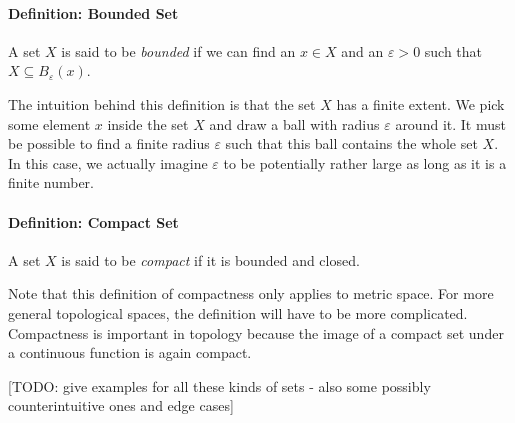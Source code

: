 
\paragraph{Definition: Bounded Set} A set $X$ is said to be \emph{bounded} if we can find an $x \in X$ and an $\varepsilon > 0$ such that $X \subseteq B_\varepsilon(x)$. 

\medskip
The intuition behind this definition is that the set $X$ has a finite extent. We pick some element $x$ inside the set $X$ and draw a ball with radius $\varepsilon$ around it. It must be possible to find a finite radius $\varepsilon$ such that this ball contains the whole set $X$. In this case, we actually imagine $\varepsilon$ to be potentially rather large as long as it is a finite number.

\paragraph{Definition: Compact Set} A set $X$ is said to be \emph{compact} if it is bounded and closed.

\medskip
Note that this definition of compactness only applies to metric space. For more general topological spaces, the definition will have to be more complicated. Compactness is important in topology because the image of a compact set under a continuous function is again compact. 


[TODO: give examples for all these kinds of sets - also some possibly counterintuitive ones and edge cases]







